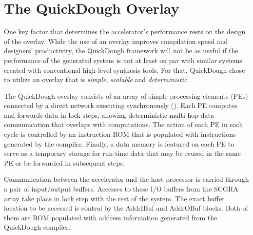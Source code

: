 \section{The QuickDough Overlay} \label{sec:scgraimplement}
One key factor that determines the accelerator's performance rests on the design of the overlay.
While the use of an overlay improves compilation speed and designers' productivity, the QuickDough framework will not be as useful if the performance of the generated system is not at least on par with similar systems created with conventional high-level synthesis tools.
For that, QuickDough chose to utilize an overlay that is \emph{simple}, \emph{scalable} and \emph{deterministic}.

The QuickDough overlay consists of an array of simple processing elements (PEs) connected by a direct network executing synchronously ().
Each PE computes and forwards data in lock steps, allowing deterministic multi-hop data communication that overlaps with computations.
The action of each PE in each cycle is controlled by an instruction ROM that is populated with instructions generated by the compiler.
Finally, a data memory is featured on each PE to serve as a temporary storage for run-time data that may be reused in the same PE or be forwarded in subsequent steps.






Communication between the accelerator and the host processor is carried through a pair of input/output buffers.
Accesses to these I/O buffers from the SCGRA array take place in lock step with the rest of the system.
The exact buffer location to be accessed is control by the AddrIBuf and AddrOBuf blocks.  Both of them are ROM populated with address information generated from the QuickDough compiler.


